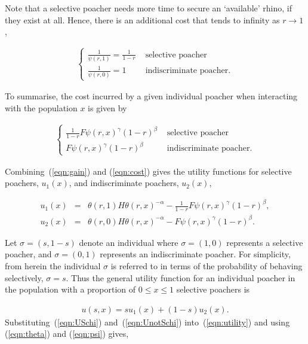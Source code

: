 \documentclass[10pt]{article}
\begin{document}
Note that a selective poacher needs
more time to secure an `available' rhino, if they exist at all. Hence, there is
an additional cost that tends to infinity as \(r \rightarrow 1\),

\begin{eqnarray}
    \label{eqn:selective_cost}
    \left\{
    \begin{array}{cl}
    \frac{1}{\psi(r, 1)} = \frac{1}{1 - r} & \mbox{ selective poacher}
    \\
    \frac{1}{\psi(r, 0)} = 1 & \mbox{ indiscriminate poacher.}
    \end{array} \right.
\end{eqnarray}

To summarise, the cost incurred by a given individual poacher when interacting
with the population \(x\) is given by

\begin{eqnarray}
    \label{eqn:cost}
    \left\{
    \begin{array}{cl}
    \frac{1}{1 - r}  F\psi(r, x)^{\gamma} (1-r)^{\beta}& \mbox{ selective poacher}
    \\
    F\psi(r, x)^{\gamma} (1-r)^{\beta}& \mbox{ indiscriminate poacher.}
    \end{array} \right.
\end{eqnarray}

\noindent Combining~(\ref{eqn:gain}) and (\ref{eqn:cost}) gives the utility functions for
selective poachers, \(u_1(x)\), and indiscriminate poachers, \(u_2(x)\),

\begin{eqnarray}
\label{eqn:USchi}
u_1(x) &=& \theta(r,1) H \theta(r,x)^{-\alpha}
- \frac{1}{1- r} F\psi(r, x)^{\gamma} (1-r)^{\beta} ,
\\
\label{eqn:UnotSchi}
u_2(x) &=& \theta(r,0) H \theta(r,x)^{-\alpha}
- F\psi(r, x)^{\gamma}  (1-r)^{\beta}.
\end{eqnarray}


Let \(\sigma=(s, 1 - s)\) denote an individual where \(\sigma =(1, 0)\) represents
a selective poacher, and \(\sigma=(0, 1)\) represents an indiscriminate poacher.
For simplicity, from herein the individual \(\sigma\) is referred to in terms
of the probability of behaving selectively, \(\sigma=s\).
Thus the general utility function for an individual poacher in the population with
a proportion of \(0 \leq x \leq 1\) selective poachers is

\begin{eqnarray}
\label{eqn:utility}
u(s, x) = s u_1(x) +(1 - s) u_2(x).
\end{eqnarray}
Substituting~(\ref{eqn:USchi}) and~(\ref{eqn:UnotSchi}) into~(\ref{eqn:utility})
and using (\ref{eqn:theta}) and (\ref{eqn:psi}) gives,
\end{document}
